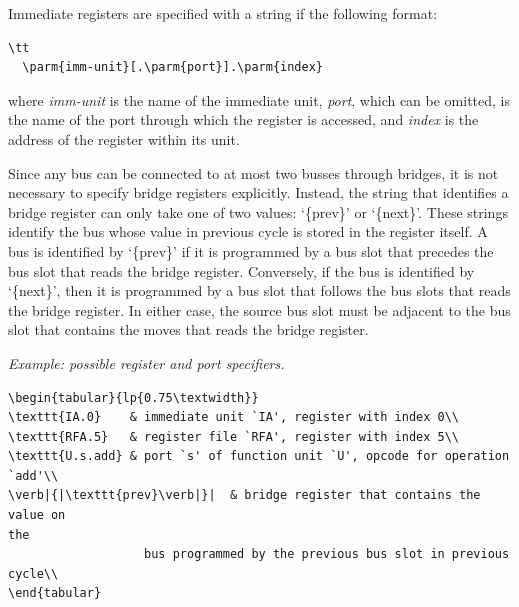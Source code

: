 \documentclass[twoside]{tceusermanual}
\begin{document}
Immediate registers are specified with a string if the following format:
\begin{verbatim}\tt
  \parm{imm-unit}[.\parm{port}].\parm{index}
\end{verbatim}
where \emph{imm-unit} is the name of the immediate unit,
%
%
\emph{port}, which can be omitted, is the name of the port through which the
register is accessed, and \emph{index} is the address of the register within
its unit.

Since any bus can be connected to at most two busses through bridges, it is
not necessary to specify bridge registers explicitly.  Instead, the string
that identifies a bridge register can only take one of two values:
`\{prev\}' or `\{next\}'.  These strings identify the bus whose value in
previous cycle is stored in the register itself.  A bus is identified by
`\{prev\}' if it is programmed by a bus slot that precedes the bus slot that
reads the bridge register.  Conversely, if the bus is identified by
`\{next\}', then it is programmed by a bus slot that follows the bus slots
that reads the bridge register.  In either case, the source bus slot must be
adjacent to the bus slot that contains the moves that reads the bridge
register.

\emph{Example: possible register and port specifiers.}
\begin{verbatim}
\begin{tabular}{lp{0.75\textwidth}}
\texttt{IA.0}    & immediate unit `IA', register with index 0\\
\texttt{RFA.5}   & register file `RFA', register with index 5\\
\texttt{U.s.add} & port `s' of function unit `U', opcode for operation
`add'\\
\verb|{|\texttt{prev}\verb|}|  & bridge register that contains the value on
the
                   bus programmed by the previous bus slot in previous
cycle\\
\end{tabular}
\end{verbatim}
\end{document}

